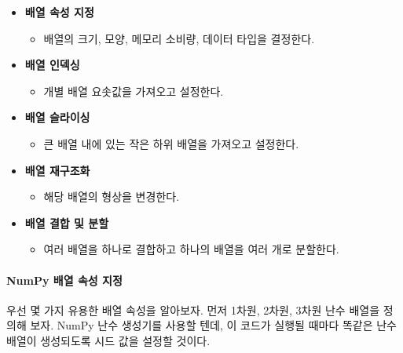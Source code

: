\documentclass[11pt]{article}
\providecommand{\tightlist}{%
      \setlength{\itemsep}{0pt}\setlength{\parskip}{0pt}}
\begin{document}
\begin{itemize}
\tightlist
\item
  \textbf{배열 속성 지정}

  \begin{itemize}
  \tightlist
  \item
    배열의 크기, 모양, 메모리 소비량, 데이터 타입을 결정한다.
  \end{itemize}
\item
  \textbf{배열 인덱싱}

  \begin{itemize}
  \tightlist
  \item
    개별 배열 요솟값을 가져오고 설정한다.
  \end{itemize}
\item
  \textbf{배열 슬라이싱}

  \begin{itemize}
  \tightlist
  \item
    큰 배열 내에 있는 작은 하위 배열을 가져오고 설정한다.
  \end{itemize}
\item
  \textbf{배열 재구조화}

  \begin{itemize}
  \tightlist
  \item
    해당 배열의 형상을 변경한다.
  \end{itemize}
\item
  \textbf{배열 결합 및 분할}

  \begin{itemize}
  \tightlist
  \item
    여러 배열을 하나로 결합하고 하나의 배열을 여러 개로 분할한다.
  \end{itemize}
\end{itemize}

    \hypertarget{numpy-uxbc30uxc5f4-uxc18duxc131-uxc9c0uxc815}{%
\paragraph{NumPy 배열 속성
지정}\label{numpy-uxbc30uxc5f4-uxc18duxc131-uxc9c0uxc815}}

우선 몇 가지 유용한 배열 속성을 알아보자. 먼저 1차원, 2차원, 3차원 난수
배열을 정의해 보자. NumPy 난수 생성기를 사용할 텐데, 이 코드가 실행될
때마다 똑같은 난수 배열이 생성되도록 시드 값을 설정할 것이다.
\end{document}
